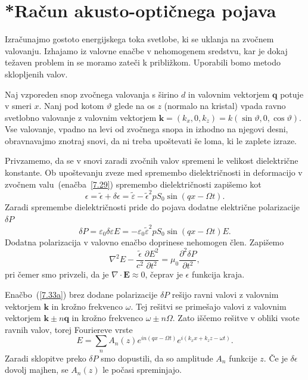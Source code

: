 \section{*Račun akusto-optičnega pojava}
Izračunajmo gostoto energijskega toka svetlobe, ki se uklanja na zvočnem valovanju. Izhajamo 
iz valovne enačbe v nehomogenem sredstvu, kar je dokaj težaven problem
in se moramo zateči k približkom. Uporabili bomo metodo sklopljenih valov. 

Naj vzporeden snop zvočnega valovanja s širino $d$ in valovnim vektorjem $\mathbf{q}$ 
potuje v smeri $x$.
Nanj pod kotom $\vartheta$ glede na os $z$ (normalo na kristal) 
vpada ravno svetlobno valovanje z valovnim vektorjem 
$\mathbf{k}=(k_{x},0,k_{z})= k(\sin\vartheta,0,\cos\vartheta)$.
Vse valovanje, vpadno na levi od zvočnega snopa in izhodno na njegovi desni,
obravnavajmo znotraj snovi, da ni treba upoštevati še loma, ki
le zaplete izraze. 

Privzamemo, da se v snovi zaradi zvočnih valov spremeni le velikost
dielektrične konstante. Ob upoštevanju zveze med spremembo dielektričnosti in deformacijo
v zvočnem valu~(enačba~\ref{7.29}) spremembo dielektričnosti
zapišemo kot  
\begin{equation}
\epsilon=\tilde{\epsilon}+\delta\epsilon = 
\tilde{\varepsilon} -\tilde{\epsilon}^{2}pS_{0}\sin(qx-\Omega t).
\label{7.33}
\end{equation}
Zaradi spremembe dielektričnosti pride do pojava
dodatne električne polarizacije $\delta P$
\begin{equation}
\delta P = \varepsilon_0 \delta \varepsilon E = - \varepsilon_0 
\tilde{\varepsilon}^2 p S_0 \sin(qx-\Omega t)E.
\end{equation}
Dodatna polarizacija v valovno enačbo doprinese nehomogen člen. Zapišemo
\begin{equation}
\nabla^{2}E-\frac{\tilde{\epsilon}}{c^{2}}{\frac{\partial E^{2}}
{\partial t^{2}}}=\mu_{0}{\frac{\partial^2 \delta P}{\partial t^{2}}},
\label{7.33a}
\end{equation}
pri čemer smo privzeli, da je $\nabla\cdot\mathbf{E}\approx 0$, čeprav je
$\epsilon$ funkcija kraja. 

Enačbo~(\ref{7.33a}) brez dodane polarizacije $\delta P$ rešijo ravni valovi 
z valovnim vektorjem $\mathbf{k}$ in krožno frekvenco $\omega$. Tej rešitvi se 
primešajo valovi z valovnim vektorjem $\mathbf{k}\pm n\mathbf{q}$
in krožno frekvenco $\omega\pm n\Omega$. Zato iščemo rešitve v obliki vsote
ravnih valov, torej Fouriereve vrste
\begin{equation}
E=\sum_{n}A_{n}(z)e^{in(qx-\Omega t)}e^{i(k_{x}x+k_{z}z-\omega t)}.
\label{7.34}
\end{equation}
Zaradi sklopitve preko $\delta P$ smo dopustili, da so amplitude
$A_{n}$ funkcije $z$. Če je $\delta\epsilon$ dovolj majhen, se $A_{n}(z)$
le počasi spreminjajo.

